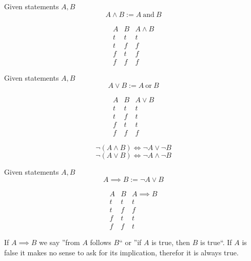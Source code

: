 \begin{definition}[Conjunction]
   Given statements \(A, B\)
   \[A \land B := A~\text{and}~B\]

   \[\begin{array}{c|c||c}
      A & B & A \land B \\
      \hline
      t & t & t \\
      t & f & f \\
      f & t & f \\
      f & f & f
   \end{array}\]
\end{definition}

\begin{definition}[Disjunction]
   Given statements \(A, B\)
   \[A \lor B := A~\text{or}~B\]

   \[\begin{array}{c|c||c}
      A & B & A \lor B \\
      \hline
      t & t & t \\
      t & f & t \\
      f & t & t \\
      f & f & f
   \end{array}\]
\end{definition}

\begin{theorem}
   \[\neg (A \land B) \iff \neg A \lor \neg B\]
   \[\neg (A \lor B) \iff \neg A \land \neg B\]
\end{theorem}

\begin{definition}[Implication]
   Given statements \(A, B\)
   \[A \implies B := \neg A \lor B\]

   \[\begin{array}{c|c||c}
      A & B & A \implies B \\
      \hline
      t & t & t \\
      t & f & f \\
      f & t & t \\
      f & f & t
   \end{array}\]
\end{definition}
\begin{remark}
   If \(A \implies B\) we say ''from \(A\) follows \(B\)`` or ''if \(A\) is true, then \(B\) is true``.
   If \(A\) is false it makes no sense to ask for its implication, therefor it is always true.
\end{remark}

